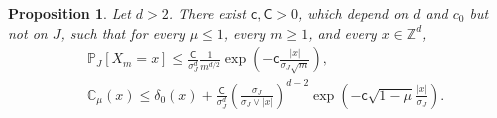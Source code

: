 \documentclass[11pt,a4paper]{article}
\numberwithin{equation}{section}
\theoremstyle{plain}
\newtheorem{Prop}[Thm]{Proposition}
\theoremstyle{definition}
\newcommand\1{\mathds{1}}
\newcommand\CGreen{\mathsf{C}}
\newcommand\cGreen{\mathsf{c}}
\begin{document}
\begin{Prop}
\label{Prop:Greenbd}
Let $d>2$.
There exist $\cGreen,\CGreen>0$, which depend on $d$ and $c_0$ but not on $J$, such that for every $\mu\leq 1$, every $m \ge 1$, and every $x\in \mathbb Z^d$,
     \begin{align}
    \label{eq:antix-app}
	&\mathbb P_{J}[X_m =x ]
    \leq \frac{\CGreen}{\sigma_J^d}\frac{1}{m^{d/2}}
    \exp\left(-\cGreen \frac{|x|}{\sigma_J\sqrt{m}}\right),
    \\
\label{eq:GJxbd-bis}
	&\mathbb C_\mu (x)
    \leq \delta_0(x)+ \frac{\CGreen}{\sigma_J^d}
    \left( \frac{\sigma_J}{\sigma_J \vee|x| } \right)^{d-2}
    \exp\left(-\cGreen\sqrt{1-\mu}\frac{|x|}{\sigma_J } \right).
\end{align}
\end{Prop}
\end{document}
